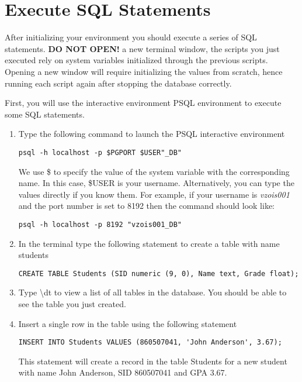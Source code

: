 \documentclass[12pt,a4paper]{article}
\begin{document}
\section{Execute SQL Statements}

After initializing your environment you should execute a series of SQL statements. \textbf{DO NOT OPEN!} a new terminal window, the scripts you just executed rely on system variables initialized through the previous scripts. Opening a new window will require initializing the values from scratch, hence running each script again after stopping the database correctly.

First, you will use the interactive environment PSQL environment to execute some SQL statements.

\begin{enumerate}
	\item  Type the following command to launch the PSQL interactive environment
	\begin{lstlisting}
psql -h localhost -p $PGPORT $USER"_DB"
	\end{lstlisting}
	We use \$ to specify the value of the system variable with the corresponding name. In this case, \$USER is your username. Alternatively, you can type the values directly if you know them. For example, if your username is \textit{vzois001} and the port number is set to 8192 then the command should look like:
	\begin{lstlisting}
psql -h localhost -p 8192 "vzois001_DB"
	\end{lstlisting}
	
	\item In the terminal type the following statement to create a table with name students
	\begin{lstlisting}
CREATE TABLE Students (SID numeric (9, 0), Name text, Grade float);
	\end{lstlisting}

	\item Type \textbackslash dt to view a list of all tables in the database. You should be able to see the table you just created.
	
	\item Insert a single row in the table using the following statement
		\begin{lstlisting}
INSERT INTO Students VALUES (860507041, 'John Anderson', 3.67);
	\end{lstlisting}
This statement will create a record in the table Students for a new student with name John Anderson, SID 860507041 and GPA 3.67.
	

\end{enumerate}
\end{document}
